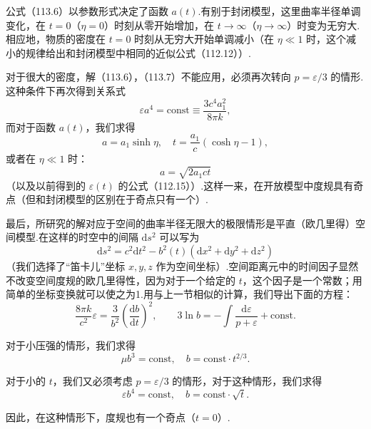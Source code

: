 公式（113.6）以参数形式决定了函数 $a(t)$.有别于封闭模型，这里曲率半径单调变化，在 $t=0$（$\eta=0$）时刻从零开始增加，在 $t\to\infty$（$\eta\to\infty$）时变为无穷大.相应地，物质的密度在 $t=0$ 时刻从无穷大开始单调减小（在 $\eta\ll1$ 时，这个减小的规律给出和封闭模型中相同的近似公式（112.12））.

对于很大的密度，解（113.6），（113.7）不能应用，必须再次转向 $p=\varepsilon/3$ 的情形.这种条件下再次得到关系式
\begin{equation}
  \varepsilon a^{4}=\mathrm{const}\equiv\frac{3c^{4}a_{1}^{2}}{8\pi k},
\end{equation}
而对于函数 $a(t)$，我们求得
\begin{equation*}
  a=a_{1}\sinh\eta,\quad t=\frac{a_{1}}{c}(\cosh\eta-1),
\end{equation*}
或者在 $\eta\ll1$ 时：
\begin{equation}
  a=\sqrt{2a_{1}ct}
\end{equation}
（以及以前得到的 $\varepsilon(t)$ 的公式（112.15））.这样一来，在开放模型中度规具有奇点（但和封闭模型的区别在于奇点只有一个）.

最后，所研究的解对应于空间的曲率半径无限大的极限情形是平直（欧几里得）空间模型.在这样的时空中的间隔 $\mathrm{d}s^{2}$ 可以写为
\begin{equation}
  \mathrm{d}s^{2}=c^{2}\mathrm{d}t^{2}
  -b^{2}(t)(\mathrm{d}x^{2}+\mathrm{d}y^{2}+\mathrm{d}z^{2})
\end{equation}
（我们选择了“笛卡儿”坐标 $x,y,z$ 作为空间坐标）.空间距离元中的时间因子显然不改变空间度规的欧几里得性，因为对于一个给定的 $t$，这个因子是一个常数；用简单的坐标变换就可以使之为1.用与上一节相似的计算，我们导出下面的方程：
\begin{equation*}
  \frac{8\pi k}{c^{2}}\varepsilon=\frac{3}{b^{2}}
  \left(\frac{\mathrm{d}b}{\mathrm{d}t}\right)^{2},\qquad
  3\ln b=-\int\frac{\mathrm{d}\varepsilon}{p+\varepsilon}+\mathrm{const}.
\end{equation*}

对于小压强的情形，我们求得
\begin{equation}
  \mu b^{3}=\mathrm{const},\quad b=\mathrm{const}\cdot t^{2/3}.
\end{equation}

对于小的 $t$，我们又必须考虑 $p=\varepsilon/3$ 的情形，对于这种情形，我们求得
\begin{equation}
  \varepsilon b^{4}=\mathrm{const},\quad b=\mathrm{const}\cdot\sqrt{t}.
\end{equation}

因此，在这种情形下，度规也有一个奇点（$t=0$）.


